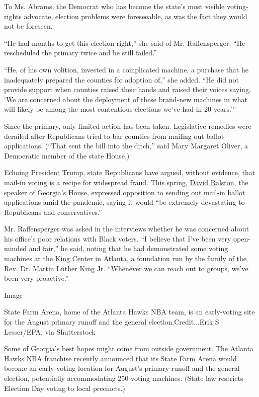 To Ms. Abrams, the Democrat who has become the state's most visible
voting-rights advocate, election problems were foreseeable, as was the
fact they would not be foreseen.

``He had months to get this election right,'' she said of Mr.
Raffensperger. ``He rescheduled the primary twice and he still failed.''

``He, of his own volition, invested in a complicated machine, a purchase
that he inadequately prepared the counties for adoption of,'' she added.
``He did not provide support when counties raised their hands and raised
their voices saying, `We are concerned about the deployment of these
brand-new machines in what will likely be among the most contentious
elections we've had in 20 years.'''

Since the primary, only limited action has been taken. Legislative
remedies were derailed after Republicans tried to bar counties from
mailing out ballot applications. (``That sent the bill into the ditch,''
said Mary Margaret Oliver, a Democratic member of the state House.)

Echoing President Trump, state Republicans have argued, without
evidence, that mail-in voting is a recipe for widespread fraud. This
spring,
\href{https://thehill.com/homenews/state-watch/490879-georgias-gop-house-speaker-says-vote-by-mail-system-would-be-devastating}{David
Ralston}, the speaker of Georgia's House, expressed opposition to
sending out mail-in ballot applications amid the pandemic, saying it
would ``be extremely devastating to Republicans and conservatives.''

Mr. Raffensperger was asked in the interviews whether he was concerned
about his office's poor relations with Black voters. ``I believe that
I've been very open-minded and fair,'' he said, noting that he had
demonstrated some voting machines at the King Center in Atlanta, a
foundation run by the family of the Rev. Dr. Martin Luther King Jr.
``Whenever we can reach out to groups, we've been very proactive.''

Image

State Farm Arena, home of the Atlanta Hawks NBA team, is an early-voting
site for the August primary runoff and the general
election.Credit...Erik S Lesser/EPA, via Shutterstock

Some of Georgia's best hopes might come from outside government. The
Atlanta Hawks NBA franchise recently announced that its State Farm Arena
would become an early-voting location for August's primary runoff and
the general election, potentially accommodating 250 voting machines.
(State law restricts Election Day voting to local precincts.)

